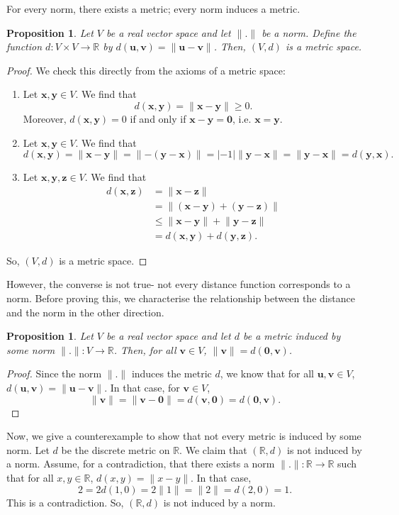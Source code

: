 \documentclass[a4paper, openany]{memoir}
\theoremstyle{definition}
\theoremstyle{plain}
\newtheorem{proposition}[definition]{Proposition}
\begin{document}
For every norm, there exists a metric; every norm induces a metric.
\begin{proposition}
    Let $V$ be a real vector space and let $\lVert . \rVert$ be a norm. Define the function $d: V \times V \to \mathbb{R}$ by $d(\bm{u}, \bm{v}) = \lVert \bm{u} - \bm{v} \rVert$. Then, $(V, d)$ is a metric space.
\end{proposition}
\begin{proof}
    We check this directly from the axioms of a metric space:
    \begin{enumerate}[label=\textbf{M\arabic*.}]
        \item Let $\bm{x}, \bm{y} \in V$. We find that
        \[d(\bm{x}, \bm{y}) = \lVert \bm{x} - \bm{y} \rVert \geq 0.\]
        Moreover, $d(\bm{x}, \bm{y}) = 0$ if and only if $\bm{x} - \bm{y} = \bm{0}$, i.e. $\bm{x} = \bm{y}$.
        \item Let $\bm{x}, \bm{y} \in V$. We find that
        \[d(\bm{x}, \bm{y}) = \lVert \bm{x} - \bm{y} \rVert = \lVert -(\bm{y} - \bm{x}) \rVert = |-1| \lVert \bm{y} - \bm{x} \rVert = \lVert \bm{y} - \bm{x} \rVert = d(\bm{y}, \bm{x}).\]
        \item Let $\bm{x}, \bm{y}, \bm{z} \in V$. We find that
        \begin{align*}
            d(\bm{x}, \bm{z}) &= \lVert \bm{x} - \bm{z} \rVert \\
            &= \lVert (\bm{x} - \bm{y}) + (\bm{y} - \bm{z}) \rVert \\
            &\leq \lVert \bm{x} - \bm{y} \rVert + \lVert \bm{y} - \bm{z} \rVert \\
            &= d(\bm{x}, \bm{y}) + d(\bm{y}, \bm{z}).
        \end{align*}
    \end{enumerate}
    So, $(V, d)$ is a metric space.
\end{proof}
However, the converse is not true- not every distance function corresponds to a norm. Before proving this, we characterise the relationship between the distance and the norm in the other direction.
\begin{proposition}
    Let $V$ be a real vector space and let $d$ be a metric induced by some norm $\lVert . \rVert: V \to \mathbb{R}$. Then, for all $\bm{v} \in V$, $\lVert \bm{v} \rVert = d(\bm{0}, \bm{v})$.
\end{proposition}
\begin{proof}
    Since the norm $\lVert . \rVert$ induces the metric $d$, we know that for all $\bm{u}, \bm{v} \in V$, $d(\bm{u}, \bm{v}) = \lVert \bm{u} - \bm{v} \rVert$. In that case, for $\bm{v} \in V$,
    \[\lVert \bm{v} \rVert = \lVert \bm{v} - \bm{0} \rVert = d(\bm{v}, \bm{0}) = d(\bm{0}, \bm{v}).\]
\end{proof}
Now, we give a counterexample to show that not every metric is induced by some norm. Let $d$ be the discrete metric on $\mathbb{R}$. We claim that $(\mathbb{R}, d)$ is not induced by a norm. Assume, for a contradiction, that there exists a norm $\lVert . \rVert: \mathbb{R} \to \mathbb{R}$ such that for all $x, y \in \mathbb{R}$, $d(x, y) = \lVert x - y \rVert$. In that case,
\[2 = 2d(1, 0) = 2\lVert 1 \rVert = \lVert 2 \rVert = d(2, 0) = 1.\]
This is a contradiction. So, $(\mathbb{R}, d)$ is not induced by a norm. 
\end{document}
